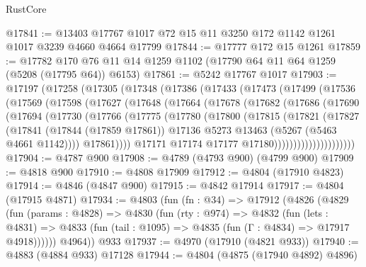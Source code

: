 \begin{lexlean}{RustCore}
\begin{coremodule}
@17841 := @13403 @17767 @1017 @72 @15 @11 @3250 @172 @1142 @1261 @1017 @3239 @4660 @4664 @17799
@17844 := @17777 @172 @15 @1261
@17859 := @17782 @170 @76 @11 @14 @1259 @1102 (@17790 @64 @11 @64 @1259 (@5208 (@17795 @64)) @6153)
@17861 := @5242 @17767 @1017
@17903 := @17197
    (@17258
      (@17305
        (@17348
          (@17386
            (@17433
              (@17473
                (@17499
                  (@17536
                    (@17569
                      (@17598
                        (@17627
                          (@17648
                            (@17664
                              (@17678
                                (@17682
                                  (@17686
                                    (@17690
                                      (@17694
                                        (@17730
                                          (@17766
                                            (@17775
                                              (@17780
                                                (@17800
                                                  (@17815
                                                    (@17821
                                                      (@17827
                                                        (@17841
                                                          (@17844 (@17859 @17861))
                                                          @17136
                                                          @5273
                                                          @13463
                                                          (@5267 (@5463 @4661 @1142))))
                                                      @17861))))
                                              @17171
                                              @17174
                                              @17177
                                              @17180)))))))))))))))))))))
@17904 := @4787 @900
@17908 := @4789 (@4793 @900) (@4799 @900)
@17909 := @4818 @900
@17910 := @4808 @17909
@17912 := @4804 (@17910 @4823)
@17914 := @4846 (@4847 @900)
@17915 := @4842 @17914
@17917 := @4804 (@17915 @4871)
@17934 := @4803
    (fun (fn : @34) =>
    @17912
      (@4826
        (@4829
          (fun (params : @4828) =>
          @4830
            (fun (rty : @974) =>
            @4832
              (fun (lets : @4831) =>
              @4833 (fun (tail : @1095) => @4835 (fun (Γ : @4834) => @17917 @4918))))))
        @4964))
    @933
@17937 := @4970 (@17910 (@4821 @933))
@17940 := @4883 (@4884 @933) @17128
@17944 := @4804 (@4875 (@17940 @4892) @4896)

\end{coremodule}
\end{lexlean}
